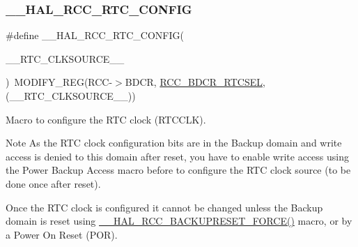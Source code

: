 \subsubsection{\texorpdfstring{\+\_\+\+\_\+\+H\+A\+L\+\_\+\+R\+C\+C\+\_\+\+R\+T\+C\+\_\+\+C\+O\+N\+F\+IG}{\_\_HAL\_RCC\_RTC\_CONFIG}}
{\footnotesize\ttfamily \#define \+\_\+\+\_\+\+H\+A\+L\+\_\+\+R\+C\+C\+\_\+\+R\+T\+C\+\_\+\+C\+O\+N\+F\+IG(\begin{DoxyParamCaption}\item[{}]{\+\_\+\+\_\+\+R\+T\+C\+\_\+\+C\+L\+K\+S\+O\+U\+R\+C\+E\+\_\+\+\_\+ }\end{DoxyParamCaption})~M\+O\+D\+I\+F\+Y\+\_\+\+R\+EG(R\+CC-\/$>$B\+D\+CR, \hyperlink{group___peripheral___registers___bits___definition_gabe30dbd38f6456990ee641648bc05d40}{R\+C\+C\+\_\+\+B\+D\+C\+R\+\_\+\+R\+T\+C\+S\+EL}, (\+\_\+\+\_\+\+R\+T\+C\+\_\+\+C\+L\+K\+S\+O\+U\+R\+C\+E\+\_\+\+\_\+))}



Macro to configure the R\+TC clock (R\+T\+C\+C\+LK). 

\begin{DoxyNote}{Note}
As the R\+TC clock configuration bits are in the Backup domain and write access is denied to this domain after reset, you have to enable write access using the Power Backup Access macro before to configure the R\+TC clock source (to be done once after reset). 

Once the R\+TC clock is configured it cannot be changed unless the Backup domain is reset using \hyperlink{group___r_c_c___r_t_c___clock___configuration_ga3bf7da608ff985873ca8e248fb1dc4f0}{\+\_\+\+\_\+\+H\+A\+L\+\_\+\+R\+C\+C\+\_\+\+B\+A\+C\+K\+U\+P\+R\+E\+S\+E\+T\+\_\+\+F\+O\+R\+C\+E()} macro, or by a Power On Reset (P\+OR).
\end{DoxyNote}

